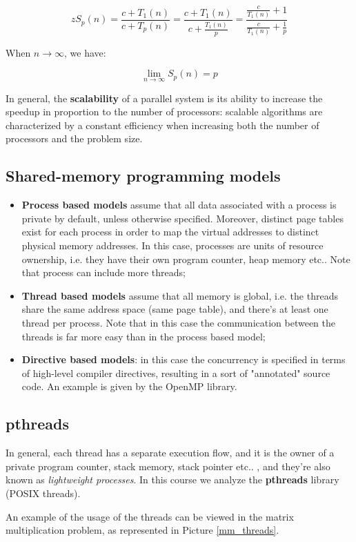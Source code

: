$$z
S_p(n) = \frac{c + T_1(n)}{c + T_p(n)} = \frac{c + T_1(n)}{c + \frac{T_1(n)}{p}} = \frac{\frac{c}{T_1(n)} + 1}{\frac{c}{T_1(n)} + \frac{1}{p}}
$$

When $n \to \infty$, we have:

$$
\lim_{n \to \infty} S_p(n) = p
$$

In general, the \textbf{scalability} of a parallel system is its ability to increase the speedup in proportion to the number of processors: scalable algorithms are characterized by a constant efficiency when increasing both the number of processors and the problem size.

\subsection{Shared-memory programming models}
\begin{itemize}
    \item \textbf{Process based models} assume that all data associated with a process is private by default, unless otherwise specified. Moreover, distinct page tables exist for each process in order to map the virtual addresses to distinct physical memory addresses. In this case, processes are units of resource ownership, i.e. they have their own program counter, heap memory etc.. Note that process can include more threads;
    \item \textbf{Thread based models} assume that all memory is global, i.e. the threads share the same address space (same page table), and there's at least one thread per process. Note that in this case the communication between the threads is far more easy than in the process based model;
    \item \textbf{Directive based models}: in this case the concurrency is specified in terms of high-level compiler directives, resulting in a sort of "annotated" source code. An example is given by the OpenMP library.
\end{itemize}

\subsection{pthreads}
In general, each thread has a separate execution flow, and it is the owner of a private program counter, stack memory, stack pointer etc.. , and they're also known as \textit{lightweight processes}. In this course we analyze the \textbf{pthreads} library (POSIX threads).

An example of the usage of the threads can be viewed in the matrix multiplication problem, as represented in Picture \ref{mm_threads}.

